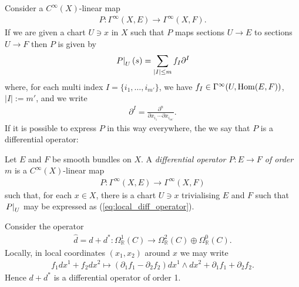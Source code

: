 \documentclass[12pt]{ociamthesis}  %
\begin{document}
Consider a $C^\infty(X)$-linear map
\begin{align*}
  P : \Gamma^\infty(X,E) \to \Gamma^\infty(X,F).
\end{align*}
If we are given a chart $U\ni x$ in $X$ such that $P$ maps sections
$U\to E$ to sections $U\to F$ then $P$ is given by
\begin{align}\label{eq:local_diff_operator}
  \left.{P}\right\vert_{U}(s) = \sum_{|I|\leq m} f_I \partial^I
\end{align}
where, for each multi index $I=\{i_1,\ldots,i_{m'}\}$, we have
$f_I\in\Gamma^\infty(U,\operatorname{Hom}(E,F))$, $|I| := m'$, and we write
\begin{align*}
  \partial^I = \frac{\partial^n}{\partial x_{i_1} \cdots \partial x_{i_{m'}}}.
\end{align*}
If it is possible to express $P$ in this way everywhere,
the we say that $P$ is a differential operator:

\begin{definition}\label{def:diff_operator}
  Let $E$ and $F$ be smooth bundles on $X$. A \emph{differential
    operator $P:E\to F$ of order $m$} is a $C^\infty(X)$-linear map
  \begin{align*}
    P : \Gamma^\infty(X,E) \to \Gamma^\infty(X,F)
  \end{align*}
  such that, for each $x\in X$, there is a chart $U\ni x$ trivialising $E$ and
  $F$ such that $\left.{P}\right\vert_{U}$ may be expressed as
  (\ref{eq:local_diff_operator}).
\end{definition}

\begin{example}
  Consider the operator
  \begin{align}\label{eq:d_hat}
    \hat d = d + d^* : \Omega^1_{\mathbb R}(C) \to \Omega^2_{\mathbb R}(C) \oplus \Omega^0_{\mathbb R}(C).
  \end{align}
  Locally, in local coordinates $(x_1,x_2)$ around $x$ we may write
  \begin{align*}
    f_1 dx^1 + f_2 dx^2 \mapsto
    (\partial_1 f_1 - \partial_2 f_2)dx^1\wedge dx^2
    + \partial_1 f_1 + \partial_2 f_2 .
  \end{align*}
  Hence $d + d^*$ is a differential operator of order 1.
\end{example}
\end{document}
